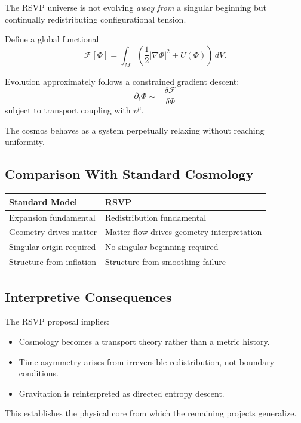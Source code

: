 \documentclass[12pt]{article}
\begin{document}
The RSVP universe is not evolving \emph{away from} a singular beginning but continually redistributing configurational tension.

Define a global functional
\begin{equation}
\mathcal{F}[\Phi] = \int_M \left( \frac{1}{2}|\nabla\Phi|^2 + U(\Phi) \right)\, dV.
\end{equation}

Evolution approximately follows a constrained gradient descent:
\[
\partial_t \Phi \sim -\frac{\delta \mathcal{F}}{\delta \Phi}
\]
subject to transport coupling with $v^\mu$.

The cosmos behaves as a system perpetually relaxing without reaching uniformity.

\subsection{Comparison With Standard Cosmology}

\begin{center}
\begin{tabular}{l l}
Standard Model & RSVP \\
\hline
Expansion fundamental & Redistribution fundamental \\
Geometry drives matter & Matter-flow drives geometry interpretation \\
Singular origin required & No singular beginning required \\
Structure from inflation & Structure from smoothing failure
\end{tabular}
\end{center}

\subsection{Interpretive Consequences}

The RSVP proposal implies:

\begin{itemize}
\item Cosmology becomes a transport theory rather than a metric history.
\item Time-asymmetry arises from irreversible redistribution, not boundary conditions.
\item Gravitation is reinterpreted as directed entropy descent.
\end{itemize}

This establishes the physical core from which the remaining projects generalize.
\end{document}
